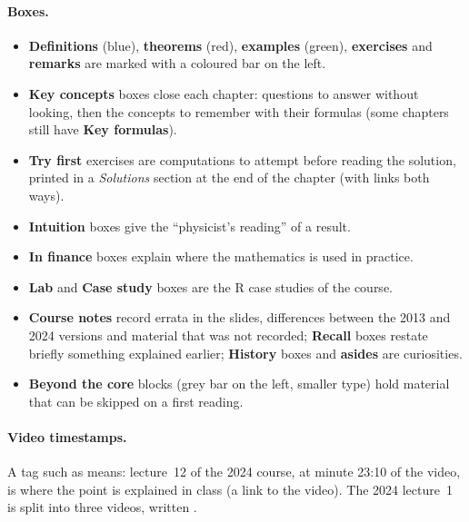 \ifdefined\publicmode\documentclass[11pt,oneside,openany]{book}\else\documentclass[12pt,oneside,openany]{book}\fi
\begin{document}
\paragraph{Boxes.}
\begin{itemize}
  \item \textcolor{defcol}{\textbf{Definitions}} (blue), \textcolor{thmcol}{\textbf{theorems}} (red),
        \textcolor{intcol}{\textbf{examples}} (green), \textcolor{exerdark}{\textbf{exercises}} and
        \textcolor{srccol}{\textbf{remarks}} are marked with a coloured bar on the left.
  \item \textcolor{keycol}{\textbf{Key concepts}} boxes close each chapter: questions to answer without looking,
        then the concepts to remember with their formulas (some chapters still have \textbf{Key formulas}).
  \item \textcolor{exerdark}{\textbf{Try first}} exercises are computations to attempt before reading the
        solution, printed in a \emph{Solutions} section at the end of the chapter (with links both ways).
  \item \textcolor{intucol}{\textbf{Intuition}} boxes give the ``physicist's reading'' of a result.
  \item \textcolor{fincol}{\textbf{In finance}} boxes explain where the mathematics is used in practice.
  \item \textcolor{cscol}{\textbf{Lab}} and \textbf{Case study} boxes are the R case studies of the course.
  \item \textcolor{srccol}{\textbf{Course notes}} record errata in the slides, differences between the 2013 and
        2024 versions and material that was not recorded; \textcolor{recallcol}{\textbf{Recall}} boxes restate
        briefly something explained earlier; \textcolor{histcol}{\textbf{History}} boxes and
        \textcolor{histcol}{\textbf{asides}} are curiosities.
  \item \textbf{Beyond the core} blocks (grey bar on the left, smaller type) hold material that can be
        skipped on a first reading.
\end{itemize}

\paragraph{Video timestamps.} A tag such as  means: lecture~12 of the 2024
course, at minute 23:10 of the video, is where the point is explained in class (a link to the video). The 2024
lecture~1 is split into three videos, written .
\end{document}
